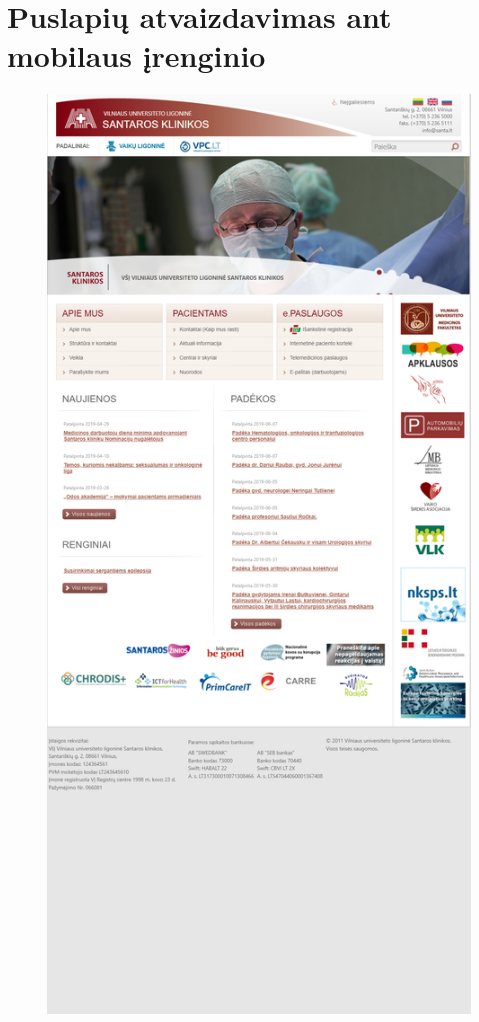 \documentclass{VUMIFPSkursinis}
\begin{document}
\section{Puslapių atvaizdavimas ant mobilaus įrenginio}
\begin{figure}[H]
    \centering
    \begin{minipage}{.5\textwidth}
    	\centering
    	\includegraphics[scale=0.12]{img/SantaMobile}

\end{minipage}
\end{figure}
\end{document}
